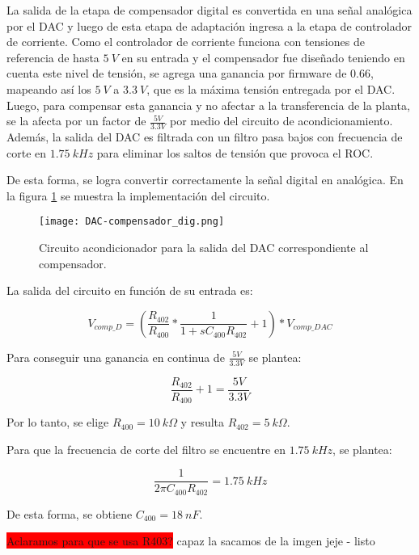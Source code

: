 La salida de la etapa de compensador digital es convertida en una señal analógica por el DAC y luego de esta etapa de adaptación ingresa a la etapa de controlador de corriente. Como el controlador de corriente funciona con tensiones de referencia de hasta $5\:V$ en su entrada y el compensador fue diseñado teniendo en cuenta este nivel de tensión, se agrega una ganancia por firmware de $0.66$, mapeando así los $5\:V$ a $3.3\:V$, que es la máxima tensión entregada por el DAC. Luego, para compensar esta ganancia y no afectar a la transferencia de la planta, se la afecta por un factor de $\frac{5V}{3.3V}$ por medio del circuito de acondicionamiento. Además, la salida del DAC es filtrada con un filtro pasa bajos con frecuencia de corte en $1.75\:kHz$ para eliminar los saltos de tensión que provoca el ROC.

De esta forma, se logra convertir correctamente la señal digital en analógica. En la figura \ref{fig:DAC-compensador} se muestra la implementación del circuito.

\begin{figure}[H]
	\centering
	\texttt{[image: DAC-compensador\_dig.png]}
	\caption{Circuito acondicionador para la salida del DAC correspondiente al compensador.}
	\label{fig:DAC-compensador}
\end{figure}

La salida del circuito en función de su entrada es:

\begin{equation*} 
	V_{comp\_D}=(\frac{R_{402}}{R_{400}} *\frac{1}{1+sC_{400}R_{402}}+1)*V_{comp\_DAC}
\end{equation*}

Para conseguir una ganancia en continua de  $\frac{5V}{3.3V}$ se plantea:

\begin{equation*} 
	\frac{R_{402}}{R_{400}} +1 = \frac{5V}{3.3V}
\end{equation*}

Por lo tanto, se elige $R_{400}=10\:k\Omega$ y resulta $R_{402}=5\:k\Omega$. 

Para que la frecuencia de corte del filtro se encuentre en $1.75\:kHz$, se plantea:

\begin{equation*} 
	\frac{1}{2\pi C_{400}R_{402}}=1.75\:kHz
\end{equation*}

De esta forma, se obtiene $C_{400}=18\:nF$. 

\colorbox{red}{Aclaramos para que se usa R403?} capaz la sacamos de la imgen jeje	- listo


